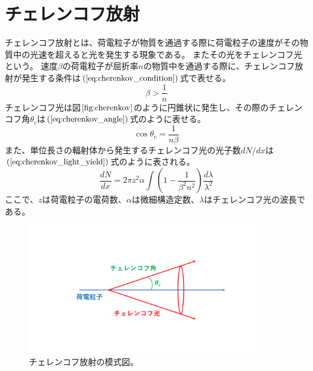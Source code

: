 \section{チェレンコフ放射}
チェレンコフ放射とは、荷電粒子が物質を通過する際に荷電粒子の速度がその物質中の光速を超えると光を発生する現象である。
またその光をチェレンコフ光という。
速度$\beta$の荷電粒子が屈折率$n$の物質中を通過する際に、チェレンコフ放射が発生する条件は$(\ref{eq:cherenkov_condition})$式で表せる。
\begin{equation}
  \label{eq:cherenkov_condition}
  \beta > \frac{1}{n}
\end{equation}
チェレンコフ光は図$\ref{fig:cherenkov}$のように円錐状に発生し、その際のチェレンコフ角$\theta_{c}$は$(\ref{eq:cherenkov_angle})$式のように表せる。
\begin{equation}
  \label{eq:cherenkov_angle}
  \cos \theta_{c} = \frac{1}{n\beta}
\end{equation}
また、単位長さの輻射体から発生するチェレンコフ光の光子数$dN/dx$は$(\ref{eq:cherenkov_light_yield})$式のように表される。
\begin{equation}
  \label{eq:cherenkov_light_yield}
  \frac{dN}{dx} = 2 \pi z^2 \alpha \int{\left(1-\frac{1}{\beta^2 n^2}\right)\frac{d\lambda}{\lambda^2}}
\end{equation}
ここで、$z$は荷電粒子の電荷数、$\alpha$は微細構造定数、$\lambda$はチェレンコフ光の波長である。
\begin{figure}[htbp]
  \centering
  \includegraphics[width=10cm]{images/chapter2/cherenkov.pdf}
  \caption[チェレンコフ放射の模式図]{チェレンコフ放射の模式図。}\label{fig:cherenkov}
\end{figure}

